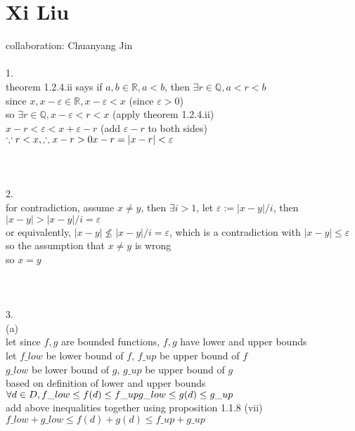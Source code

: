 \documentclass[12pt, border = 4pt, multi]{article} %
\begin{document}
\section*{Xi Liu}
collaboration: Chuanyang Jin\\
\\
1.\\
theorem 1.2.4.ii says if $a, b \in \mathbb{R}, a < b$, then $\exists r \in \mathbb{Q}, a < r < b$\\
since $x, x - \varepsilon \in \mathbb{R}, x - \varepsilon < x$ \qquad (since $\varepsilon > 0$)\\
so $\exists r \in \mathbb{Q}, x - \varepsilon < r < x$ \qquad (apply theorem 1.2.4.ii)\\
$x - r < \varepsilon < x + \varepsilon - r$ \qquad (add $\varepsilon - r$ to both sides)\\
$\because r < x, \therefore x - r > 0\\
x - r = |x - r| < \varepsilon$\\
\\
\\
\\
2.\\
for contradiction, assume $x \not= y$, then $\exists i > 1$, let $\varepsilon := |x - y| / i$, then $|x - y| > |x - y| / i = \varepsilon$\\
or equivalently, $|x - y| \not\leq |x - y| / i = \varepsilon$, which is a contradiction with $|x - y| \leq \varepsilon$\\
so the assumption that $x \not= y$ is wrong\\
so $x = y$\\
\\
\\
\\
3.\\
(a)\\
let since $f, g$ are bounded functions, $f, g$ have lower and upper bounds\\
let $f\_low$ be lower bound of $f$, $f\_up$ be upper bound of $f$\\
$g\_low$ be lower bound of $g$, $g\_up$ be upper bound of $g$\\
based on definition of lower and upper bounds\\
$\forall d \in D, f\_low \leq f(d) \leq f\_up\\
g\_low \leq g(d) \leq g\_up$\\
add above inequalities together using proposition 1.1.8 (vii)\\ 
$f\_low + g\_low \leq f(d) + g(d) \leq f\_up + g\_up$\\
\end{document}
